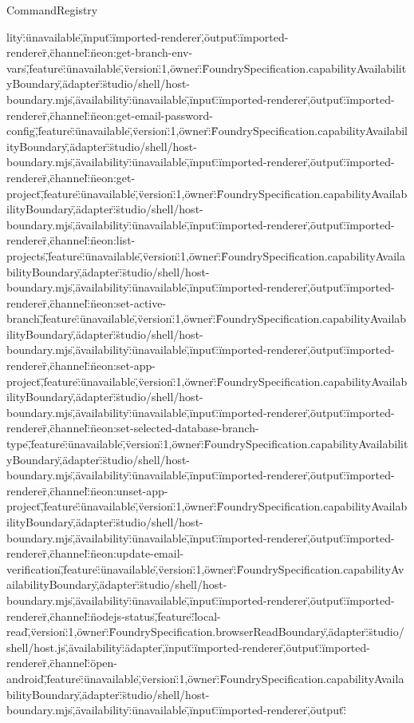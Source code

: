 \begin{lexlean}{CommandRegistry}
\begin{semanticmodule}
{lity\":\"unavailable\",\"input\":\"imported-renderer\",\"output\":\"imported-renderer\"},{\"channel\":\"neon:get-branch-env-vars\",\"feature\":\"unavailable\",\"version\":1,\"owner\":\"FoundrySpecification.capabilityAvailabilityBoundary\",\"adapter\":\"studio/shell/host-boundary.mjs\",\"availability\":\"unavailable\",\"input\":\"imported-renderer\",\"output\":\"imported-renderer\"},{\"channel\":\"neon:get-email-password-config\",\"feature\":\"unavailable\",\"version\":1,\"owner\":\"FoundrySpecification.capabilityAvailabilityBoundary\",\"adapter\":\"studio/shell/host-boundary.mjs\",\"availability\":\"unavailable\",\"input\":\"imported-renderer\",\"output\":\"imported-renderer\"},{\"channel\":\"neon:get-project\",\"feature\":\"unavailable\",\"version\":1,\"owner\":\"FoundrySpecification.capabilityAvailabilityBoundary\",\"adapter\":\"studio/shell/host-boundary.mjs\",\"availability\":\"unavailable\",\"input\":\"imported-renderer\",\"output\":\"imported-renderer\"},{\"channel\":\"neon:list-projects\",\"feature\":\"unavailable\",\"version\":1,\"owner\":\"FoundrySpecification.capabilityAvailabilityBoundary\",\"adapter\":\"studio/shell/host-boundary.mjs\",\"availability\":\"unavailable\",\"input\":\"imported-renderer\",\"output\":\"imported-renderer\"},{\"channel\":\"neon:set-active-branch\",\"feature\":\"unavailable\",\"version\":1,\"owner\":\"FoundrySpecification.capabilityAvailabilityBoundary\",\"adapter\":\"studio/shell/host-boundary.mjs\",\"availability\":\"unavailable\",\"input\":\"imported-renderer\",\"output\":\"imported-renderer\"},{\"channel\":\"neon:set-app-project\",\"feature\":\"unavailable\",\"version\":1,\"owner\":\"FoundrySpecification.capabilityAvailabilityBoundary\",\"adapter\":\"studio/shell/host-boundary.mjs\",\"availability\":\"unavailable\",\"input\":\"imported-renderer\",\"output\":\"imported-renderer\"},{\"channel\":\"neon:set-selected-database-branch-type\",\"feature\":\"unavailable\",\"version\":1,\"owner\":\"FoundrySpecification.capabilityAvailabilityBoundary\",\"adapter\":\"studio/shell/host-boundary.mjs\",\"availability\":\"unavailable\",\"input\":\"imported-renderer\",\"output\":\"imported-renderer\"},{\"channel\":\"neon:unset-app-project\",\"feature\":\"unavailable\",\"version\":1,\"owner\":\"FoundrySpecification.capabilityAvailabilityBoundary\",\"adapter\":\"studio/shell/host-boundary.mjs\",\"availability\":\"unavailable\",\"input\":\"imported-renderer\",\"output\":\"imported-renderer\"},{\"channel\":\"neon:update-email-verification\",\"feature\":\"unavailable\",\"version\":1,\"owner\":\"FoundrySpecification.capabilityAvailabilityBoundary\",\"adapter\":\"studio/shell/host-boundary.mjs\",\"availability\":\"unavailable\",\"input\":\"imported-renderer\",\"output\":\"imported-renderer\"},{\"channel\":\"nodejs-status\",\"feature\":\"local-read\",\"version\":1,\"owner\":\"FoundrySpecification.browserReadBoundary\",\"adapter\":\"studio/shell/host.js\",\"availability\":\"adapter\",\"input\":\"imported-renderer\",\"output\":\"imported-renderer\"},{\"channel\":\"open-android\",\"feature\":\"unavailable\",\"version\":1,\"owner\":\"FoundrySpecification.capabilityAvailabilityBoundary\",\"adapter\":\"studio/shell/host-boundary.mjs\",\"availability\":\"unavailable\",\"input\":\"imported-renderer\",\"output\":\"}
\end{semanticmodule}
\end{lexlean}
